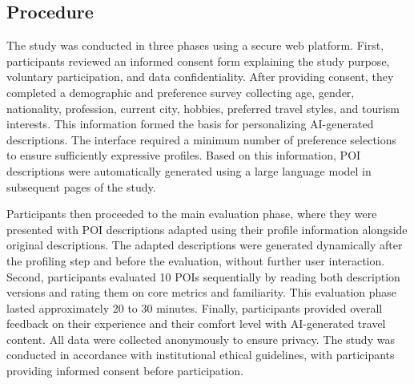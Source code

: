 
\subsection{Procedure}
The study was conducted in three phases using a secure web platform.  First, participants reviewed an informed consent form explaining the study purpose, voluntary participation, and data confidentiality. After providing consent, they completed a demographic and preference survey collecting age, gender, nationality, profession, current city, hobbies, preferred travel styles, and tourism interests. This information formed the basis for personalizing AI-generated descriptions. The interface required a minimum number of preference selections to ensure sufficiently expressive profiles. Based on this information, POI descriptions were automatically generated using a large language model in subsequent pages of the study.

Participants then proceeded to the main evaluation phase, where they were presented with POI descriptions adapted using their profile information alongside original descriptions. The adapted descriptions were generated dynamically after the profiling step and before the evaluation, without further user interaction. Second, participants evaluated 10 POIs sequentially by reading both description versions and rating them on core metrics and familiarity. This evaluation phase lasted approximately 20 to 30 minutes. Finally, participants provided overall feedback on their experience and their comfort level with AI-generated travel content. All data were collected anonymously to ensure privacy. The study was conducted in accordance with institutional ethical guidelines, with participants providing informed consent before participation.

